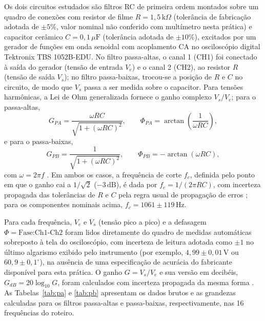 \documentclass[reprint,amsmath,amssymb,aps,prl,floatfix,onecolumn]{revtex4-2}
\begin{document}
Os dois circuitos estudados são filtros RC de primeira ordem montados sobre um quadro de conexões com resistor de filme $R=1{,}5\,\text{k}\Omega$ (tolerância de fabricação adotada de $\pm5\%$, valor nominal não conferido com multímetro nesta prática) e capacitor cerâmico $C=0{,}1\,\mu\text{F}$ (tolerância adotada de $\pm10\%$), excitados por um gerador de funções em onda senoidal com acoplamento CA no osciloscópio digital Tektronix TBS 1052B-EDU. No filtro passa-altas, o canal 1 (CH1) foi conectado à saída do gerador (tensão de entrada $V_e$) e o canal 2 (CH2), ao resistor $R$ (tensão de saída $V_s$); no filtro passa-baixas, trocou-se a posição de $R$ e $C$ no circuito, de modo que $V_s$ passa a ser medida sobre o capacitor. Para tensões harmônicas, a Lei de Ohm generalizada fornece o ganho complexo $V_s/V_e$; para o passa-altas,
\begin{equation}
	\label{eq:ganho_pa}
	G_{PA}=\frac{\omega RC}{\sqrt{1+(\omega RC)^2}}, \qquad \Phi_{PA}=\arctan\!\left(\frac{1}{\omega RC}\right),
\end{equation}
e para o passa-baixas,
\begin{equation}
	\label{eq:ganho_pb}
	G_{PB}=\frac{1}{\sqrt{1+(\omega RC)^2}}, \qquad \Phi_{PB}=-\arctan(\omega RC),
\end{equation}
com $\omega=2\pi f$ \cite{Nussenzveig1997,Malvino2008}. Em ambos os casos, a frequência de corte $f_c$, definida pelo ponto em que o ganho cai a $1/\sqrt{2}$ ($-3\,\text{dB}$), é dada por $f_c=1/(2\pi RC)$, com incerteza propagada das tolerâncias de $R$ e $C$ pela regra usual de propagação de erros \cite{Vuolo1996}; para os componentes nominais acima, $f_c=1061\pm119\,\text{Hz}$.

Para cada frequência, $V_e$ e $V_s$ (tensão pico a pico) e a defasagem $\Phi=\text{Fase:Ch1-Ch2}$ foram lidos diretamente do quadro de medidas automáticas sobreposto à tela do osciloscópio, com incerteza de leitura adotada como $\pm1$ no último algarismo exibido pelo instrumento (por exemplo, $4{,}99\pm0{,}01\,\text{V}$ ou $60{,}9\pm0{,}1^\circ$), na ausência de uma especificação de acurácia do fabricante disponível para esta prática. O ganho $G=V_s/V_e$ e sua versão em decibéis, $G_{dB}=20\log_{10}G$, foram calculados com incerteza propagada da mesma forma \cite{Vuolo1996}. As Tabelas~\ref{tab:pa} e \ref{tab:pb} apresentam os dados brutos e as grandezas calculadas para os filtros passa-altas e passa-baixas, respectivamente, nas 16 frequências do roteiro.
\end{document}
